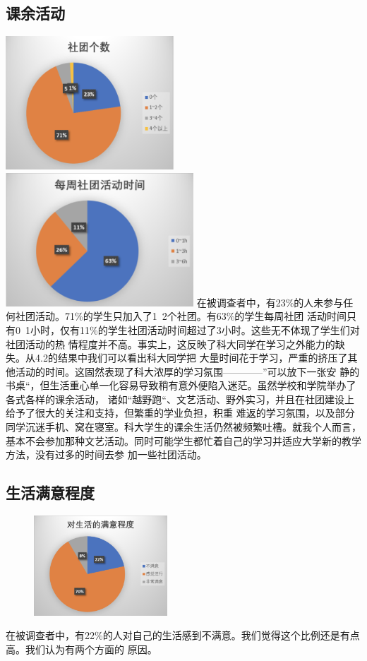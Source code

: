 \documentclass[UTF8]{ctexart}
\begin{document}
\subsection{课余活动}
\includegraphics[height=5cm]{chart/社团个数.png}
\includegraphics[height=5cm]{chart/每周社团活动时间.png}
在被调查者中，有23\%的人未参与任何社团活动。71\%的学生只加入了1~2个社团。有63\%的学生每周社团
活动时间只有0~1小时，仅有11\%的学生社团活动时间超过了3小时。这些无不体现了学生们对社团活动的热
情程度并不高。事实上，这反映了科大同学在学习之外能力的缺失。从4.2的结果中我们可以看出科大同学把
大量时间花于学习，严重的挤压了其他活动的时间。这固然表现了科大浓厚的学习氛围————”可以放下一张安
静的书桌“，但生活重心单一化容易导致稍有意外便陷入迷茫。虽然学校和学院举办了各式各样的课余活动，
诸如“越野跑“、文艺活动、野外实习，并且在社团建设上给予了很大的关注和支持，但繁重的学业负担，积重
难返的学习氛围，以及部分同学沉迷手机、窝在寝室。科大学生的课余生活仍然被频繁吐槽。就我个人而言，
基本不会参加那种文艺活动。同时可能学生都忙着自己的学习并适应大学新的教学方法，没有过多的时间去参
加一些社团活动。

\subsection{生活满意程度}
\begin{figure}
\includegraphics[width=5cm]{chart/生活满意程度.png}
\end{figure}
在被调查者中，有22\%的人对自己的生活感到不满意。我们觉得这个比例还是有点高。我们认为有两个方面的
原因。
\end{document}
